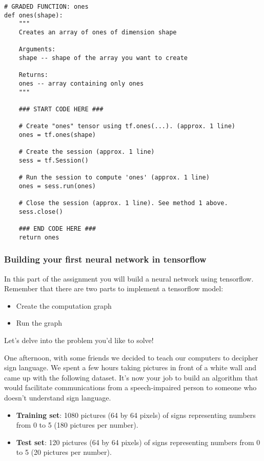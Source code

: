 \begin{verbatim} 
# GRADED FUNCTION: ones
def ones(shape):
    """
    Creates an array of ones of dimension shape
    
    Arguments:
    shape -- shape of the array you want to create
        
    Returns: 
    ones -- array containing only ones
    """
    
    ### START CODE HERE ###
    
    # Create "ones" tensor using tf.ones(...). (approx. 1 line)
    ones = tf.ones(shape)
    
    # Create the session (approx. 1 line)
    sess = tf.Session()
    
    # Run the session to compute 'ones' (approx. 1 line)
    ones = sess.run(ones)
    
    # Close the session (approx. 1 line). See method 1 above.
    sess.close()
    
    ### END CODE HERE ###
    return ones
\end{verbatim} 



\subsubsection{Building your first neural network in tensorflow}

In this part of the assignment you will build a neural network using tensorflow. Remember that there are two parts to implement a tensorflow model:
\begin{itemize}
\item Create the computation graph
\item Run the graph
\end{itemize}

Let's delve into the problem you'd like to solve!



One afternoon, with some friends we decided to teach our computers to decipher sign language. We spent a few hours taking pictures in front of a white wall and came up with the following dataset. It's now your job to build an algorithm that would facilitate communications from a speech-impaired person to someone who doesn't understand sign language.
\begin{itemize}
\item {\textbf {Training set}}: 1080 pictures (64 by 64 pixels) of signs representing numbers from 0 to 5 (180 pictures per number).
\item {\textbf {Test set}}: 120 pictures (64 by 64 pixels) of signs representing numbers from 0 to 5 (20 pictures per number).
\end{itemize}

